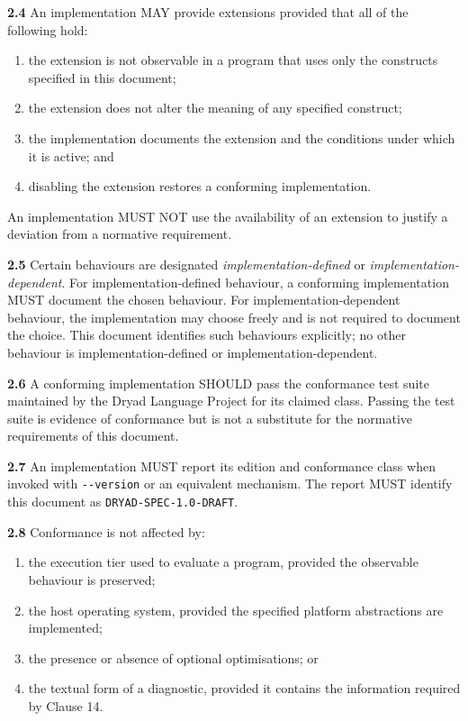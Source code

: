 \documentclass[
  english,
  11pt,
  a4paper,
]{article}
\providecommand{\tightlist}{%
  \setlength{\itemsep}{0pt}\setlength{\parskip}{0pt}}
\begin{document}
\textbf{2.4} An implementation MAY provide extensions provided that all
of the following hold:

\begin{enumerate}
\def\labelenumi{\arabic{enumi}.}
\tightlist
\item
  the extension is not observable in a program that uses only the
  constructs specified in this document;
\item
  the extension does not alter the meaning of any specified construct;
\item
  the implementation documents the extension and the conditions under
  which it is active; and
\item
  disabling the extension restores a conforming implementation.
\end{enumerate}

An implementation MUST NOT use the availability of an extension to
justify a deviation from a normative requirement.

\textbf{2.5} Certain behaviours are designated
\emph{implementation-defined} or \emph{implementation-dependent}. For
implementation-defined behaviour, a conforming implementation MUST
document the chosen behaviour. For implementation-dependent behaviour,
the implementation may choose freely and is not required to document the
choice. This document identifies such behaviours explicitly; no other
behaviour is implementation-defined or implementation-dependent.

\textbf{2.6} A conforming implementation SHOULD pass the conformance
test suite maintained by the Dryad Language Project for its claimed
class. Passing the test suite is evidence of conformance but is not a
substitute for the normative requirements of this document.

\textbf{2.7} An implementation MUST report its edition and conformance
class when invoked with \texttt{-\/-version} or an equivalent mechanism.
The report MUST identify this document as \texttt{DRYAD-SPEC-1.0-DRAFT}.

\textbf{2.8} Conformance is not affected by:

\begin{enumerate}
\def\labelenumi{\arabic{enumi}.}
\tightlist
\item
  the execution tier used to evaluate a program, provided the observable
  behaviour is preserved;
\item
  the host operating system, provided the specified platform
  abstractions are implemented;
\item
  the presence or absence of optional optimisations; or
\item
  the textual form of a diagnostic, provided it contains the information
  required by Clause 14.
\end{enumerate}
\end{document}
